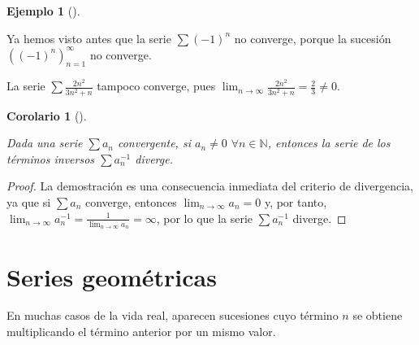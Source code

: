 \documentclass[
  a4paper,
]{scrreport}
\theoremstyle{definition}
\newtheorem{example}{Ejemplo}[chapter]
\theoremstyle{plain}
\newtheorem{corollary}{Corolario}[chapter]
\theoremstyle{definition}
\theoremstyle{definition}
\theoremstyle{plain}
\theoremstyle{plain}
\theoremstyle{remark}
\begin{document}
\begin{example}[]\protect\hypertarget{exm-criterio-divergencia}{}\label{exm-criterio-divergencia}

Ya hemos visto antes que la serie \(\sum (-1)^n\) no converge, porque la
sucesión \(((-1)^n)_{n=1}^\infty\) no converge.

La serie \(\sum \frac{2n^2}{3n^2+n}\) tampoco converge, pues
\(\lim_{n\to\infty}\frac{2n^2}{3n^2+n}=\frac{2}{3}\neq 0\).

\end{example}

\begin{corollary}[]\protect\hypertarget{cor-divergencia-serie-inversa-convergente}{}\label{cor-divergencia-serie-inversa-convergente}

Dada una serie \(\sum a_n\) convergente, si \(a_n\neq 0\)
\(\forall n\in\mathbb{N}\), entonces la serie de los términos inversos
\(\sum a_n^{-1}\) diverge.

\end{corollary}

\begin{tcolorbox}[enhanced jigsaw, leftrule=.75mm, colbacktitle=quarto-callout-note-color!10!white, toprule=.15mm, opacityback=0, opacitybacktitle=0.6, toptitle=1mm, breakable, bottomtitle=1mm, colframe=quarto-callout-note-color-frame, rightrule=.15mm, titlerule=0mm, title=\textcolor{quarto-callout-note-color}{\faInfo}\hspace{0.5em}{Demostración}, arc=.35mm, left=2mm, bottomrule=.15mm, colback=white, coltitle=black]

\begin{proof}
La demostración es una consecuencia inmediata del criterio de
divergencia, ya que si \(\sum a_n\) converge, entonces
\(\lim_{n\to\infty} a_n = 0\) y, por tanto,
\(\lim_{n\to\infty} a_n^{-1} = \frac{1}{\lim_{n\to\infty} a_n} = \infty\),
por lo que la serie \(\sum a_n^{-1}\) diverge.
\end{proof}

\end{tcolorbox}

\section{Series geométricas}\label{series-geomuxe9tricas}

En muchas casos de la vida real, aparecen sucesiones cuyo término \(n\)
se obtiene multiplicando el término anterior por un mismo valor.
\end{document}
